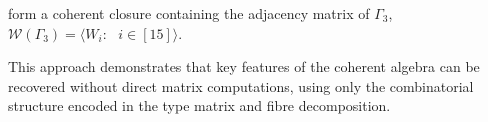 form a coherent closure containing the adjacency matrix of $\Gamma_3$, $\mathcal{W}(\Gamma_3)=\langle W_i: \text{ }i\in[15]\rangle$.

This approach demonstrates that key features of the coherent algebra can be recovered without direct matrix computations, using only the combinatorial structure encoded in the type matrix and fibre decomposition.




